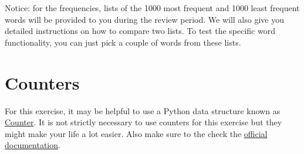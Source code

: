 \documentclass[11pt, leqno, a4paper]{article}
\begin{document}
Notice: for the frequencies, lists of the 1000 most frequent and 1000 least frequent words will be provided to you during the review period. We will also give
you detailed instructions on how to compare two lists. To test the specific word functionality, you can just pick a couple of words from these lists.

\enlargethispage{1cm}
\section{Counters}
For this exercise, it may be helpful to use a Python data structure known as 
\href{https://pymotw.com/2/collections/counter.html}{Counter}. It is not strictly necessary to use counters
for this exercise but they might make your life a lot easier. Also make sure to the check the
\href{https://docs.python.org/2/library/collections.html#collections.Counter}{official documentation}.
\end{document}
